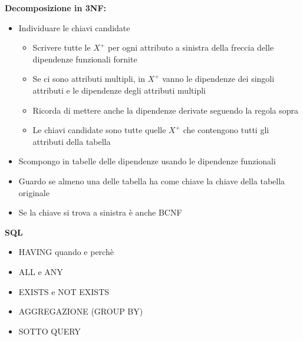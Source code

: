 \documentclass[10pt]{article}
\begin{document}
\textbf{Decomposizione in 3NF:}
\begin{itemize}
    \item Individuare le chiavi candidate \begin{itemize}
        \item Scrivere tutte le $X^{+}$ per ogni attributo a sinistra della freccia delle dipendenze funzionali fornite
        \item Se ci sono attributi multipli, in $X^{+}$ vanno le dipendenze dei singoli attributi e le dipendenze degli attributi multipli
        \item Ricorda di mettere anche la dipendenze derivate seguendo la regola sopra
        \item Le chiavi candidate sono tutte quelle $X^{+}$ che contengono tutti gli attributi della tabella
    \end{itemize}
    \item Scompongo in tabelle delle dipendenze usando le dipendenze funzionali
    \item Guardo se almeno una delle tabella ha come chiave la chiave della tabella originale
    \item Se la chiave si trova a sinistra è anche BCNF
\end{itemize}
\textbf{SQL}
\begin{itemize}
    \item HAVING quando e perchè
    \item ALL e ANY
    \item EXISTS e NOT EXISTS
    \item AGGREGAZIONE (GROUP BY)
    \item SOTTO QUERY
\end{itemize}
\end{document}
